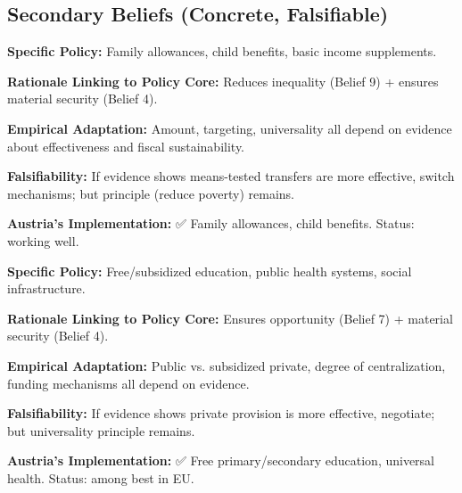 \subsection{Secondary Beliefs (Concrete, Falsifiable)}

\begin{tcolorbox}[colback=green!5!white, colframe=green!75!black,
    title=Secondary Belief 11: Universal Cash Transfers]

\textbf{Specific Policy:} Family allowances, child benefits, basic income supplements.

\textbf{Rationale Linking to Policy Core:} Reduces inequality (Belief 9) + ensures material security (Belief 4).

\textbf{Empirical Adaptation:} Amount, targeting, universality all depend on evidence about effectiveness and fiscal sustainability.

\textbf{Falsifiability:} If evidence shows means-tested transfers are more effective, switch mechanisms; but principle (reduce poverty) remains.

\textbf{Austria's Implementation:} ✅ Family allowances, child benefits. Status: working well.

\end{tcolorbox}

\begin{tcolorbox}[colback=green!5!white, colframe=green!75!black,
    title=Secondary Belief 12: Public Service Provision]

\textbf{Specific Policy:} Free/subsidized education, public health systems, social infrastructure.

\textbf{Rationale Linking to Policy Core:} Ensures opportunity (Belief 7) + material security (Belief 4).

\textbf{Empirical Adaptation:} Public vs. subsidized private, degree of centralization, funding mechanisms all depend on evidence.

\textbf{Falsifiability:} If evidence shows private provision is more effective, negotiate; but universality principle remains.

\textbf{Austria's Implementation:} ✅ Free primary/secondary education, universal health. Status: among best in EU.

\end{tcolorbox}

